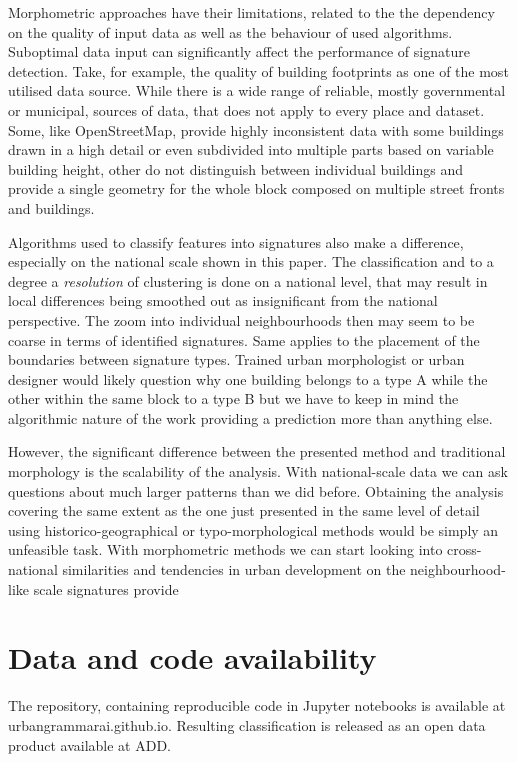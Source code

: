 Morphometric approaches have their limitations, related to the the dependency on the
quality of input data as well as the behaviour of used algorithms. Suboptimal data
input can significantly affect the performance of signature detection. Take, for example,
the quality of building footprints as one of the most utilised data source. While there
is a wide range of reliable, mostly governmental or municipal, sources of data, that
does not apply to every place and dataset. Some, like OpenStreetMap, provide highly
inconsistent data with some buildings drawn in a high detail or even subdivided into
multiple parts based on variable building height, other do not distinguish between
individual buildings and provide a single geometry for the whole block composed on
multiple street fronts and buildings.

Algorithms used to classify features into signatures also make a difference, especially
on the national scale shown in this paper. The classification and to a degree a
\textit{resolution} of clustering is done on a national level, that may result in local
differences being smoothed out as insignificant from the national perspective. The zoom
into individual neighbourhoods then may seem to be coarse in terms of identified
signatures. Same applies to the placement of the boundaries between signature types.
Trained urban morphologist or urban designer would likely question why one building
belongs to a type A while the other within the same block to a type B but we have to
keep in mind the algorithmic nature of the work providing a prediction more than
anything else.

However, the significant difference between the presented method and traditional
morphology is the scalability of the analysis. With national-scale data we can ask
questions about much larger patterns than we did before. Obtaining the analysis covering
the same extent as the one just presented in the same level of detail using
historico-geographical or typo-morphological methods would be simply an unfeasible task.
With morphometric methods we can start looking into cross-national similarities and
tendencies in urban development on the neighbourhood-like scale signatures provide

\section{Data and code availability}
The repository, containing reproducible code in Jupyter notebooks is available at
urbangrammarai.github.io. Resulting classification is released as an open data product
available at ADD.